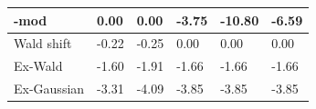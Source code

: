 \begin{tabular}{|l|l|l|l|l|l|}
\hline
\rocdd{}-mod&0.00&0.00&-3.75&-10.80&-6.59\\\hline
Wald shift&-0.22&-0.25&0.00&0.00&0.00\\\hline
Ex-Wald&-1.60&-1.91&-1.66&-1.66&-1.66\\\hline
Ex-Gaussian&-3.31&-4.09&-3.85&-3.85&-3.85\\\hline
\end{tabular}
